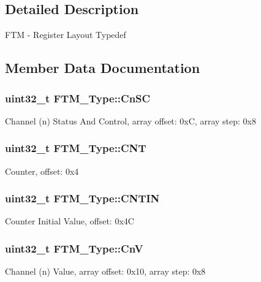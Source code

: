 \subsection{Detailed Description}
F\+TM -\/ Register Layout Typedef 

\subsection{Member Data Documentation}
\subsubsection[{\texorpdfstring{Cn\+SC}{CnSC}}]{ uint32\+\_\+t F\+T\+M\+\_\+\+Type\+::\+Cn\+SC}\hypertarget{structFTM__Type_a1f30106e7fbc8f5a00b586ddfcfe113a}{}\label{structFTM__Type_a1f30106e7fbc8f5a00b586ddfcfe113a}
Channel (n) Status And Control, array offset\+: 0xC, array step\+: 0x8 
\subsubsection[{\texorpdfstring{C\+NT}{CNT}}]{ uint32\+\_\+t F\+T\+M\+\_\+\+Type\+::\+C\+NT}\hypertarget{structFTM__Type_aafebc28d2a0aa309a2e6eb71cc646c1b}{}\label{structFTM__Type_aafebc28d2a0aa309a2e6eb71cc646c1b}
Counter, offset\+: 0x4 
\subsubsection[{\texorpdfstring{C\+N\+T\+IN}{CNTIN}}]{ uint32\+\_\+t F\+T\+M\+\_\+\+Type\+::\+C\+N\+T\+IN}\hypertarget{structFTM__Type_a5dde356f5ee4d309ea1d4380a9501eb9}{}\label{structFTM__Type_a5dde356f5ee4d309ea1d4380a9501eb9}
Counter Initial Value, offset\+: 0x4C 
\subsubsection[{\texorpdfstring{CnV}{CnV}}]{ uint32\+\_\+t F\+T\+M\+\_\+\+Type\+::\+CnV}\hypertarget{structFTM__Type_a4a374e850fc48c7559277888b350539c}{}\label{structFTM__Type_a4a374e850fc48c7559277888b350539c}
Channel (n) Value, array offset\+: 0x10, array step\+: 0x8 
